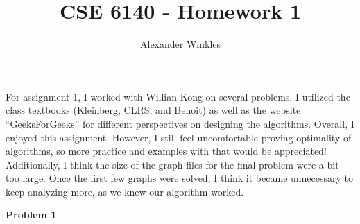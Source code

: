 \documentclass{article}
\title{CSE 6140 - Homework 1}
\author{Alexander Winkles}
\date{}
\newcommand{\Problem}[1]{\textbf{Problem #1}}
\begin{document}
\maketitle

\vspace{2in}

For assignment 1, I worked with Willian Kong on several problems. 
I utilized the class textbooks (Kleinberg, CLRS, and Benoit) as well as the website ``GeeksForGeeks'' for different perspectives on designing the algorithms.
Overall, I enjoyed this assignment.
However, I still feel uncomfortable proving optimality of algorithms, so more practice and examples with that would be appreciated!
Additionally, I think the size of the graph files for the final problem were a bit too large.
Once the first few graphs were solved, I think it became unnecessary to keep analyzing more, as we knew our algorithm worked. 

\newpage

\Problem{1}
\end{document}
